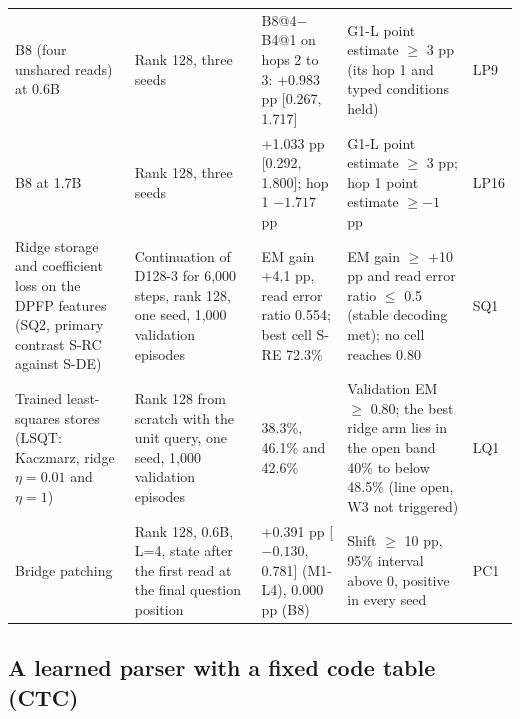 \begin{table}[htbp]
\begin{tabular}{@{}W{160}{10}W{190}{10}W{240}{10}W{300}{10}W{110}{10}@{}}
B8 (four unshared reads) at 0.6B & Rank 128, three seeds & B8@4$-$B4@1 on hops 2 to 3: +0.983 pp [0.267, 1.717] & G1-L point estimate $\geq$ 3 pp (its hop 1 and typed conditions held) & LP9 \\
B8 at 1.7B & Rank 128, three seeds & +1.033 pp [0.292, 1.800]; hop 1 $-1.717$ pp & G1-L point estimate $\geq$ 3 pp; hop 1 point estimate $\geq -1$ pp & LP16 \\
Ridge storage and coefficient loss on the DPFP features (SQ2, primary contrast S-RC against S-DE) & Continuation of D128-3 for 6,000 steps, rank 128, one seed, 1,000 validation episodes & EM gain +4.1 pp, read error ratio 0.554; best cell S-RE 72.3\% & EM gain $\geq$ +10 pp and read error ratio $\leq$ 0.5 (stable decoding met); no cell reaches 0.80 & SQ1 \\
Trained least-squares stores (LSQT: Kaczmarz, ridge $\eta=0.01$ and $\eta=1$) & Rank 128 from scratch with the unit query, one seed, 1,000 validation episodes & 38.3\%, 46.1\% and 42.6\% & Validation EM $\geq$ 0.80; the best ridge arm lies in the open band 40\% to below 48.5\% (line open, W3 not triggered) & LQ1 \\
Bridge patching & Rank 128, 0.6B, L=4, state after the first read at the final question position & +0.391 pp [$-0.130$, 0.781] (M1-L4), 0.000 pp (B8) & Shift $\geq$ 10 pp, 95\% interval above 0, positive in every seed & PC1 \\
\bottomrule
\end{tabular}
\end{table}

\subsection{A learned parser with a fixed code table (CTC)}
\label{sec:ctc}

